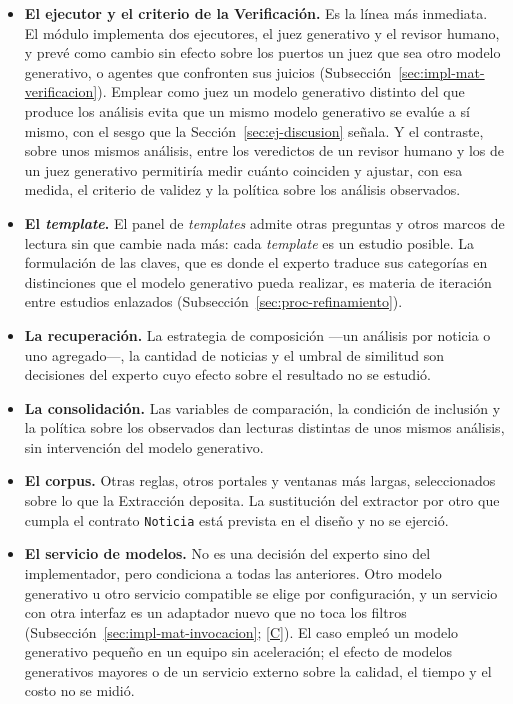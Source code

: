\documentclass[12pt]{report}
\DeclareRobustCommand{\resp}[1]{\hyperref[tab:registro-responsabilidades]{\textcolor{respcolor}{[#1]}}}
\begin{document}
\begin{itemize}
  \item \textbf{El ejecutor y el criterio de la Verificación.} Es la línea más inmediata. El módulo implementa dos ejecutores, el juez generativo y el revisor humano, y prevé como cambio sin efecto sobre los puertos un juez que sea otro modelo generativo, o agentes que confronten sus juicios (Subsección~\ref{sec:impl-mat-verificacion}). Emplear como juez un modelo generativo distinto del que produce los análisis evita que un mismo modelo generativo se evalúe a sí mismo, con el sesgo que la Sección~\ref{sec:ej-discusion} señala. Y el contraste, sobre unos mismos análisis, entre los veredictos de un revisor humano y los de un juez generativo permitiría medir cuánto coinciden y ajustar, con esa medida, el criterio de validez y la política sobre los análisis observados.
  \item \textbf{El \textit{template}.} El panel de \textit{templates} admite otras preguntas y otros marcos de lectura sin que cambie nada más: cada \textit{template} es un estudio posible. La formulación de las claves, que es donde el experto traduce sus categorías en distinciones que el modelo generativo pueda realizar, es materia de iteración entre estudios enlazados (Subsección~\ref{sec:proc-refinamiento}).
  \item \textbf{La recuperación.} La estrategia de composición ---un análisis por noticia o uno agregado---, la cantidad de noticias y el umbral de similitud son decisiones del experto cuyo efecto sobre el resultado no se estudió.
  \item \textbf{La consolidación.} Las variables de comparación, la condición de inclusión y la política sobre los observados dan lecturas distintas de unos mismos análisis, sin intervención del modelo generativo.
  \item \textbf{El corpus.} Otras reglas, otros portales y ventanas más largas, seleccionados sobre lo que la Extracción deposita. La sustitución del extractor por otro que cumpla el contrato \texttt{Noticia} está prevista en el diseño y no se ejerció.
  \item \textbf{El servicio de modelos.} No es una decisión del experto sino del implementador, pero condiciona a todas las anteriores. Otro modelo generativo u otro servicio compatible se elige por configuración, y un servicio con otra interfaz es un adaptador nuevo que no toca los filtros (Subsección~\ref{sec:impl-mat-invocacion}; \resp{C}). El caso empleó un modelo generativo pequeño en un equipo sin aceleración; el efecto de modelos generativos mayores o de un servicio externo sobre la calidad, el tiempo y el costo no se midió.
\end{itemize}
\end{document}
